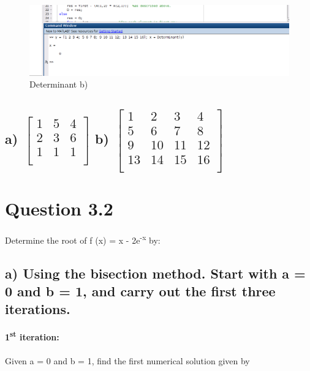 \documentclass{report}
\begin{document}
                    

            \begin{figure}[h!]
                        \includegraphics[width=\linewidth]{Determinant_b).png}
                        \caption{Determinant b)}
                        \label{fig:Determinant b)}
            \end{figure}

                    


		\subsection*{a) $\begin{bmatrix}
            1 & 5 & 4\\
            2 & 3 & 6\\
            1 & 1 & 1\\
            \end{bmatrix}$ b) $\begin{bmatrix}
                1 & 2 & 3 & 4\\
                5 & 6 & 7 & 8\\
                9 & 10 & 11 & 12\\
                13 & 14 & 15 & 16\\
                \end{bmatrix}$}


                
    
                  












    \section*{\hfil Question 3.2 \hfil}
    Determine the root of f (x) = x - 2e\textsuperscript{-x} by:
        \subsection*{a) Using the bisection method. Start with a = 0 and  b = 1, and carry out the first three iterations.}
                \textbf{1\textsuperscript{st} iteration:}\\\\
                Given a = 0 and b = 1, find the first numerical solution given by 
\end{document}
